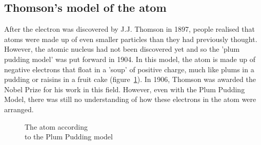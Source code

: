             \subsection*{Thomson's model of the atom}
            \nopagebreak
\begin{minipage}{.5\textwidth}
        \label{m38756*id254616}After the electron was discovered by J.J. Thomson in 1897, people realised that atoms were made up of even smaller particles than they had previously thought. However, the atomic nucleus had not been discovered yet and so the 'plum pudding model' was put forward in 1904. In this model, the atom is made up of negative electrons that float in a 'soup' of positive charge, much like plums in a pudding or raisins in a fruit cake (figure~\ref{fig:atom:plumpudding}). In 1906, Thomson was awarded the Nobel Prize for his work in this field. However, even with the Plum Pudding Model, there was still no understanding of how these electrons in the atom were arranged.\par 
\end{minipage}
\begin{minipage}{.5\textwidth}
	\begin{figure}[H] %
    \begin{center}
\begin{minipage}{.8\textwidth}
\caption{The atom according \\ to the Plum Pudding model}
\end{minipage}
\label{fig:atom:plumpudding}
\end{center}
 \end{figure}    
\end{minipage}  
